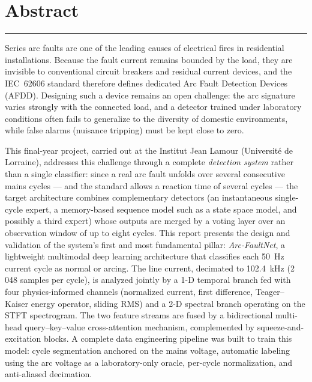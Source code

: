 \chapter*{Abstract}

\noindent\rule{\linewidth}{1pt}
\vspace{0.3cm}

\noindent Series arc faults are one of the leading causes of electrical fires in residential installations. Because the fault current remains bounded by the load, they are invisible to conventional circuit breakers and residual current devices, and the IEC~62606 standard therefore defines dedicated Arc Fault Detection Devices (AFDD). Designing such a device remains an open challenge: the arc signature varies strongly with the connected load, and a detector trained under laboratory conditions often fails to generalize to the diversity of domestic environments, while false alarms (nuisance tripping) must be kept close to zero.

\medskip

\noindent This final-year project, carried out at the Institut Jean Lamour (Université de Lorraine), addresses this challenge through a complete \emph{detection system} rather than a single classifier: since a real arc fault unfolds over several consecutive mains cycles --- and the standard allows a reaction time of several cycles --- the target architecture combines complementary detectors (an instantaneous single-cycle expert, a memory-based sequence model such as a state space model, and possibly a third expert) whose outputs are merged by a voting layer over an observation window of up to eight cycles. This report presents the design and validation of the system's first and most fundamental pillar: \emph{Arc-FaultNet}, a lightweight multimodal deep learning architecture that classifies each 50~Hz current cycle as normal or arcing. The line current, decimated to 102.4~kHz (2\,048 samples per cycle), is analyzed jointly by a 1-D temporal branch fed with four physics-informed channels (normalized current, first difference, Teager--Kaiser energy operator, sliding RMS) and a 2-D spectral branch operating on the STFT spectrogram. The two feature streams are fused by a bidirectional multi-head query--key--value cross-attention mechanism, complemented by squeeze-and-excitation blocks. A complete data engineering pipeline was built to train this model: cycle segmentation anchored on the mains voltage, automatic labeling using the arc voltage as a laboratory-only oracle, per-cycle normalization, and anti-aliased decimation.

